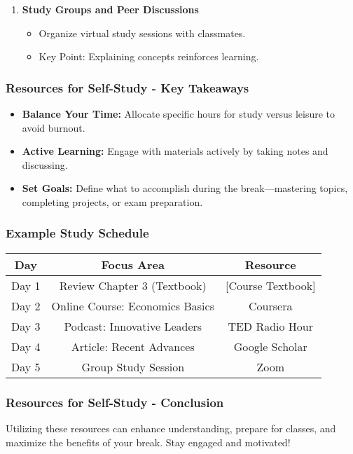 \documentclass[aspectratio=169]{beamer}
\begin{document}
\begin{frame}[fragile]
\begin{enumerate}
        \item \textbf{Study Groups and Peer Discussions}
            \begin{itemize}
                \item Organize virtual study sessions with classmates.
                \item Key Point: Explaining concepts reinforces learning.
            \end{itemize}
    \end{enumerate}
\end{frame}

\begin{frame}[fragile]
    \frametitle{Resources for Self-Study - Key Takeaways}
    \begin{itemize}
        \item \textbf{Balance Your Time:} Allocate specific hours for study versus leisure to avoid burnout.
        \item \textbf{Active Learning:} Engage with materials actively by taking notes and discussing.
        \item \textbf{Set Goals:} Define what to accomplish during the break—mastering topics, completing projects, or exam preparation.
    \end{itemize}
\end{frame}

\begin{frame}[fragile]
    \frametitle{Example Study Schedule}
    \begin{center}
        \begin{tabular}{|c|c|c|}
            \hline
            \textbf{Day} & \textbf{Focus Area} & \textbf{Resource} \\
            \hline
            Day 1 & Review Chapter 3 (Textbook) & [Course Textbook] \\
            Day 2 & Online Course: Economics Basics & Coursera \\
            Day 3 & Podcast: Innovative Leaders & TED Radio Hour \\
            Day 4 & Article: Recent Advances & Google Scholar \\
            Day 5 & Group Study Session & Zoom \\
            \hline
        \end{tabular}
    \end{center}
\end{frame}

\begin{frame}[fragile]
    \frametitle{Resources for Self-Study - Conclusion}
    Utilizing these resources can enhance understanding, prepare for classes, and maximize the benefits of your break. Stay engaged and motivated!
\end{frame}
\end{document}

